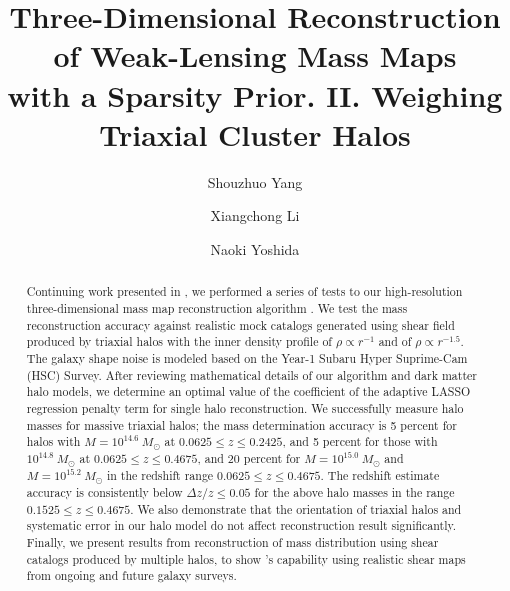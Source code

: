 \documentclass[twocolumn, usenames, dvipsnames]{aastex63}
\begin{document}
\title{
Three-Dimensional Reconstruction of Weak-Lensing Mass Maps \\
with a Sparsity Prior. II.
Weighing Triaxial Cluster Halos
}
\author{Shouzhuo Yang}
\author{Xiangchong Li}
\author{Naoki Yoshida}

\begin{abstract}
Continuing work presented in \cite{massmap_Li2021}, we performed a series of
tests to our high-resolution three-dimensional mass map reconstruction
algorithm \splinv{}. We test the mass reconstruction accuracy against
realistic mock catalogs generated using shear field produced by triaxial
halos with the inner density profile of $\rho \propto r^{-1}$
and of $\rho \propto r^{-1.5}$.
The galaxy shape noise is modeled
based on the Year-1 Subaru Hyper Suprime-Cam (HSC) Survey. After reviewing
mathematical details of our algorithm and dark matter halo models, we
determine an optimal value of the coefficient of the adaptive LASSO
regression penalty term for single halo reconstruction. We
successfully measure halo masses for massive triaxial halos;
the mass determination accuracy is
5 percent for halos with $M = 10^{14.6}~M_\odot$ at $0.0625\leq z \leq 0.2425$, and 5 percent for those with $10^{14.8}~M_\odot$
at $0.0625\leq z \leq 0.4675$, and 20 percent for $M= 10^{15.0} ~M_\odot$ and
$M=10^{15.2}~M_\odot$ in the redshift range $0.0625\leq z \leq 0.4675$. The redshift estimate accuracy is consistently below $\Delta z /z \leq 0.05$ for
the above halo masses in the range $0.1525\leq z \leq 0.4675$. We also
demonstrate that the orientation of triaxial halos and systematic error in
our halo model do not affect reconstruction result significantly. Finally,
we present results from reconstruction of mass distribution
using shear
catalogs produced by multiple halos, to show \splinv{}'s capability using realistic shear maps from ongoing and future galaxy surveys.
\end{abstract}
\end{document}
